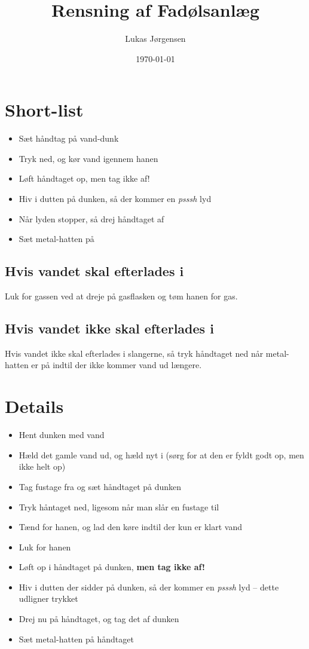 

\title{Rensning af Fadølsanlæg}
\date{\today}
\author{Lukas Jørgensen}



\maketitle

\section{Short-list}

\begin{itemize}
  \item Sæt håndtag på vand-dunk
  \item Tryk ned, og kør vand igennem hanen
  \item Løft håndtaget op, men tag ikke af!
  \item Hiv i dutten på dunken, så der kommer en \textit{psssh} lyd
  \item Når lyden stopper, så drej håndtaget af
  \item Sæt metal-hatten på
\end{itemize}

\subsection{Hvis vandet skal efterlades i}
Luk for gassen ved at dreje på gasflasken og tøm hanen for gas.

\subsection{Hvis vandet ikke skal efterlades i}
Hvis vandet ikke skal efterlades i slangerne, så tryk håndtaget ned når metal-hatten er på indtil der ikke kommer vand ud længere.

\section{Details}
\begin{itemize}
  \item Hent dunken med vand
  \item Hæld det gamle vand ud, og hæld nyt i (sørg for at den er fyldt godt op, men ikke helt op)
  \item Tag fustage fra og sæt håndtaget på dunken
  \item Tryk håntaget ned, ligesom når man slår en fustage til
  \item Tænd for hanen, og lad den køre indtil der kun er klart vand
  \item Luk for hanen
  \item Løft op i håndtaget på dunken, \textbf{men tag ikke af!}
  \item Hiv i dutten der sidder på dunken, så der kommer en \textit{psssh} lyd -- dette udligner trykket
  \item Drej nu på håndtaget, og tag det af dunken
  \item Sæt metal-hatten på håndtaget
\end{itemize}


